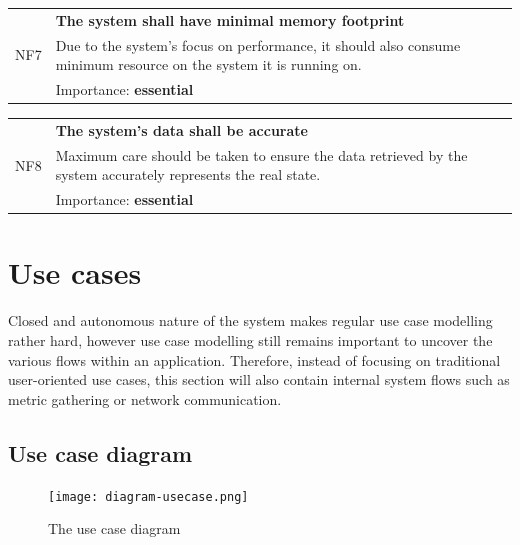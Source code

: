 \documentclass[12pt,a4paper,table]{article}
\begin{document}
            \vspace{0.5cm}
            \noindent
            \begin{tabular}{ p{0.7cm}|p{14.5cm} }
                \multirow{3}{*}{NF7} & \textbf{The system shall have minimal memory footprint}\\
                \cline{2-2}
                & Due to the system's focus on performance, it should also consume minimum resource on the system it is running on.\\
                \cline{2-2}
                & Importance: \textbf{essential}
            \end{tabular}

            \vspace{0.5cm}
            \noindent
            \begin{tabular}{ p{0.7cm}|p{14.5cm} }
                \multirow{3}{*}{NF8} & \textbf{The system's data shall be accurate}\\
                \cline{2-2}
                & Maximum care should be taken to ensure the data retrieved by the system accurately represents the real state.\\
                \cline{2-2}
                & Importance: \textbf{essential}
            \end{tabular}

    \pagebreak

    \section{Use cases}
        Closed and autonomous nature of the system makes regular use case modelling rather hard, however use case modelling still remains important to uncover the various flows within an application. Therefore, instead of focusing on traditional user-oriented use cases, this section will also contain internal system flows such as metric gathering or network communication.

        \subsection{Use case diagram}
            \begin{center}
                \begin{figure}[!h]
                    \texttt{[image: diagram-usecase.png]}
                    \caption{The use case diagram}
                    \label{fig:diagram-usecase}
                \end{figure}
            \end{center}
\end{document}
